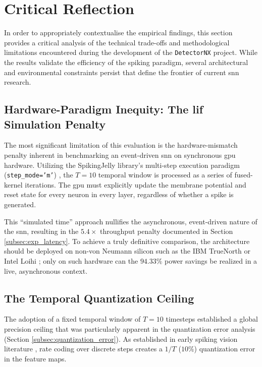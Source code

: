 \section{Critical Reflection}
\label{sec:critical_reflection}

In order to appropriately contextualise the empirical findings, this section provides a critical analysis of the technical trade-offs and methodological limitations encountered during the development of the \texttt{DetectorNX} project. 
While the results validate the efficiency of the spiking paradigm, several architectural and environmental constraints persist that define the frontier of current \gls{snn} research.

\subsection{Hardware-Paradigm Inequity: The \gls{lif} Simulation Penalty}
The most significant limitation of this evaluation is the hardware-mismatch penalty inherent in benchmarking an event-driven \gls{snn} on synchronous \gls{gpu} hardware. 
Utilizing the SpikingJelly library's multi-step execution paradigm (\texttt{step\_mode='m'}) \cite{fang2023spikingjelly}, the $T=10$ temporal window is processed as a series of fused-kernel iterations. The \gls{gpu} must explicitly update the membrane potential and reset state for every neuron in every layer, regardless of whether a spike is generated. 

This ``simulated time'' approach nullifies the asynchronous, event-driven nature of the \gls{snn}, resulting in the $5.4\times$ throughput penalty documented in Section \ref{subsec:exp_latency}. 
To achieve a truly definitive comparison, the architecture should be deployed on non-von Neumann silicon such as the IBM TrueNorth \cite{merolla2014million} or Intel Loihi \cite{davies2018loihi};
only on such hardware can the $94.33\%$ power savings be realized in a live, asynchronous context.

\subsection{The Temporal Quantization Ceiling}
The adoption of a fixed temporal window of $T=10$ timesteps established a global precision ceiling that was particularly apparent in the quantization error analysis (Section \ref{subsec:quantization_error}). 
As established in early spiking vision literature \cite{THORPE2001715}, rate coding over discrete steps creates a $1/T$ ($10\%$) quantization error in the feature maps. 

